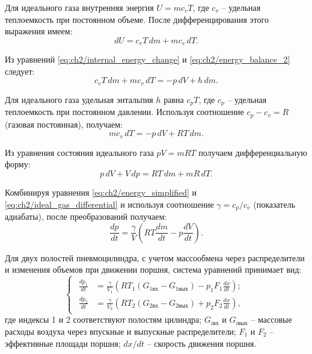 Для идеального газа внутренняя энергия $U = mc_vT$,
где $c_v$ -- удельная теплоемкость при постоянном объеме. После дифференцирования этого выражения имеем:
\begin{equation}
	\label{eq:ch2/energy_balance_2}
	dU = c_vT\,dm + mc_v\,dT.
\end{equation}

Из уравнений \eqref{eq:ch2/internal_energy_change} и \eqref{eq:ch2/energy_balance_2} следует:
\begin{equation}
	\label{eq:ch2/energy_equality}
	c_vT\,dm + mc_v\,dT = -p\,dV + h\,dm.
\end{equation}

Для идеального газа удельная энтальпия $h$ равна $c_pT$,
где $c_p$ -- удельная теплоемкость при постоянном давлении.
Используя соотношение $c_p - c_v = R$ (газовая постоянная), получаем:
\begin{equation}
	\label{eq:ch2/energy_simplified}
	mc_v\,dT = -p\,dV + RT\,dm.
\end{equation}

Из уравнения состояния идеального газа $pV = mRT$ получаем дифференциальную форму:
\begin{equation}
	\label{eq:ch2/ideal_gas_differential}
	p\,dV + V\,dp = RT\,dm + mR\,dT.
\end{equation}

Комбинируя уравнения \eqref{eq:ch2/energy_simplified} и \eqref{eq:ch2/ideal_gas_differential} и
используя соотношение $\gamma = c_p/c_v$ (показатель адиабаты), после преобразований получаем:
\begin{equation}
	\label{eq:ch2/pressure_change}
	\frac{dp}{dt} = \frac{\gamma}{V}\left(RT\frac{dm}{dt} - p\frac{dV}{dt}\right).
\end{equation}

Для двух полостей пневмоцилиндра, с учетом массообмена через распределители и
изменения объемов при движении поршня, система уравнений принимает вид:
\begin{equation}
	\label{eq:ch2/final_pressure_system}
	\begin{cases}
		\begin{aligned}
			\frac{dp_1}{dt} & = \frac{\gamma}{V_1}\left(RT_1(G_{1\text{вх}} - G_{1\text{вых}}) - p_1F_1\frac{dx}{dt}\right); \\
			\frac{dp_2}{dt} & = \frac{\gamma}{V_2}\left(RT_2(G_{2\text{вх}} - G_{2\text{вых}}) + p_2F_2\frac{dx}{dt}\right),
		\end{aligned}
	\end{cases}
\end{equation}
где индексы 1 и 2 соответствуют полостям цилиндра;
$G_{i\text{вх}}$ и $G_{i\text{вых}}$ -- массовые расходы воздуха
через впускные и выпускные распределители;
$F_1$ и $F_2$ -- эффективные площади поршня;
$dx/dt$ -- скорость движения поршня.

